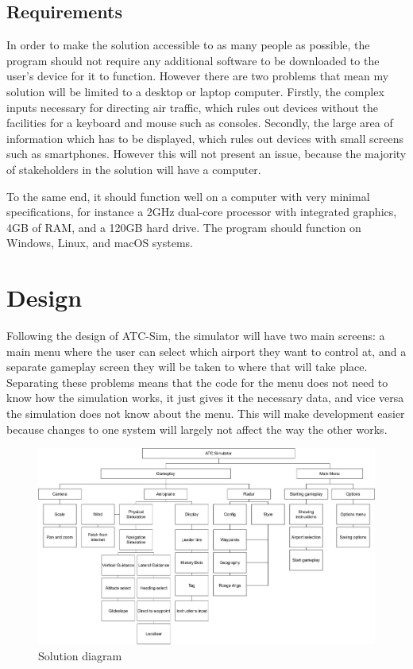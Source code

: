\documentclass{article}
\begin{document}


\subsection{Requirements}
In order to make the solution accessible to as many people as possible, the program should not require any additional software to be downloaded to the user's device for it to function.
However there are two problems that mean my solution will be limited to a desktop or laptop computer.
Firstly, the complex inputs necessary for directing air traffic, which rules out devices without the facilities for a keyboard and mouse such as consoles.
Secondly, the large area of information which has to be displayed, which rules out devices with small screens such as smartphones.
However this will not present an issue, because the majority of stakeholders in the solution will have a computer.

To the same end, it should function well on a computer with very minimal specifications, for instance a 2GHz dual-core processor with integrated graphics, 4GB of RAM, and a 120GB hard drive.
The program should function on Windows, Linux, and macOS systems.
\clearpage


\section{Design}
Following the design of ATC-Sim, the simulator will have two main screens: a main menu where the user can select which airport they want to control at, and a separate gameplay screen they will be taken to where that will take place.
Separating these problems means that the code for the menu does not need to know how the simulation works, it just gives it the necessary data, and vice versa the simulation does not know about the menu.
This will make development easier because changes to one system will largely not affect the way the other works.
\begin{figure}
    \includegraphics[width=\textwidth]{diagrams/problemdiagram.png}
    \caption{\label{fig:solution_diagram}Solution diagram}
\end{figure}
\clearpage
\end{document}
